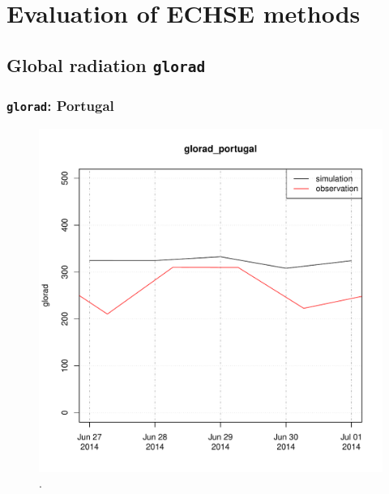 \documentclass{scrreprt}
\begin{document}

\chapter{Evaluation of ECHSE methods} \label{ch:methodcomp}

\section{Global radiation \texttt{glorad}}

\subsection{\texttt{glorad}: Portugal}

\begin{figure}[ht]
  \centering
  \includegraphics[width=0.8\hsize]{./plot_glorad_compare_portugal_HS_2014-06-26_2014-07-01.pdf}
  \caption{.}
  \label{fig:portugal_HS_glorad1}
\end{figure}
\end{document}

